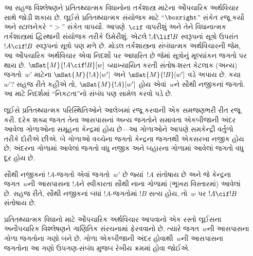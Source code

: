 આ સહજ વિશ્લેષણને પ્રતિતથ્યાત્મક વિધાનોના તર્કશાસ્ત્ર માટેના ઔપચારિક
અર્થવિચાર સાથે જોડી શકાય છે. લૂઈસે પ્રતિતથ્યાત્મક સંયોજક માટે
``$\boxright$'' સંકેત રજૂ કર્યો અને સ્ટાલનેકરે~``$>$'' સંકેત વાપર્યો.
આપણે~$\cif$ વાપરીશું અને તેને વિધાનાત્મક તર્કશાસ્ત્રમાં દ્વિસ્થાની
સંયોજક તરીકે ઉમેરીશું. એટલે $!A \lif
!B$ સ્વરૂપનાં સૂત્રો ઉપરાંત~$!A \cif !B$ સ્વરૂપનાં
સૂત્રો પણ મળે છે. મોડલ તર્કશાસ્ત્રના સંબંધાત્મક અર્થવિચારની
જેમ, આ ઔપચારિક અર્થવિચાર એવા નિદર્શો પર આધારિત છે જેમાં
સૂત્રોનું મૂલ્યાંકન જગતો પર થાય છે. $\mSat{M}{!A \cif !B}[w]$
વ્યાખ્યાયિત કરતી સંતોષ-શરત કેટલાક (અન્ય) જગતો~$w'$ માટેના
$\mSat{M}{!A}[w']$ અને $\mSat{M}{!B}[w']$ વડે અપાય છે. કયા~$w'$?
સહજ રીતે કહીએ તો, $\mSat{M}{!A}[w']$ હોય એવાં~$w$ને સૌથી નજીકનાં
જગતો. આ માટે નિદર્શમાં ``નિકટતા''નો સંબંધ પણ સામેલ કરવો પડે છે.

લૂઈસે પ્રતિતથ્યાત્મક પરિસ્થિતિઓને આલેખમાં રજૂ કરવાની એક સમજણભરી
રીત રજૂ કરી. દરેક શક્ય જગત તેના આસપાસનાં અન્ય જગતોને સમાવતા
એકબીજાની અંદર આવેલા ગોળાઓના સમૂહના કેન્દ્રમાં હોય છે---આ ગોળાઓને
આપણે સમકેન્દ્રી વર્તુળો તરીકે દોરીએ છીએ. બે ગોળાઓ વચ્ચેના જગતો
કેન્દ્રના જગતથી એકસરખા નજીક હોય છે; અંદરના ગોળામાં આવેલાં જગતો
વધુ નજીક અને બહારના ગોળામાં આવેલાં જગતો વધુ દૂર હોય છે.
\begin{center}
\end{center}
સૌથી નજીકનાં $!A$-જગતો એવાં જગતો~$w'$ છે જ્યાં~$!A$ સંતોષાય છે
અને જે કેન્દ્રના જગત~$w$ની આસપાસના $!A$ને સ્વીકારતા સૌથી નાના ગોળામાં (ભૂખરા
વિસ્તારમાં) આવેલાં છે. સહજ રીતે, સૌથી નજીકનાં બધાં $!A$-જગતોમાં
$!B$ સત્ય હોય, તો~$w$ પર $!A \cif !B$ સંતોષાય છે.
\endgroup


\begingroup
\makeatletter{}\makeatother


\label{guunit:OLP-0524}


પ્રતિતથ્યાત્મક વિધાનો માટે ઔપચારિક અર્થવિચાર આપવાનો એક રસ્તો લૂઈસના
અનૌપચારિક વિશ્લેષણને ગાણિતિક સંરચનામાં ફેરવવાનો છે. ત્યારે
જગત~$w$ની આસપાસના ગોળા જગતોના ગણો બને છે. ગોળા એકબીજાની અંદર
હોવાથી~$w$ની આસપાસના જગતોના આ ગણો ઉપગણ-સંબંધ મુજબ રેખીય ક્રમમાં
હોવા જોઈએ.

